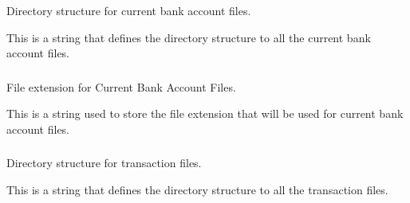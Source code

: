 Directory structure for current bank account files. 

This is a string that defines the directory structure to all the current bank account files. \hypertarget{classInteractiveStreamHandler_a422f78691f53bc8a8b79f2c8e7edc04f}{
\subsubsection[{current\_\-bank\_\-accounts\_\-file\_\-name}]{}}
\label{classInteractiveStreamHandler_a422f78691f53bc8a8b79f2c8e7edc04f}


File extension for Current Bank Account Files. 

This is a string used to store the file extension that will be used for current bank account files. \hypertarget{classInteractiveStreamHandler_afb0932ba0075caf93d401e5d695e963f}{
\subsubsection[{tra\_\-directory}]{}}
\label{classInteractiveStreamHandler_afb0932ba0075caf93d401e5d695e963f}


Directory structure for transaction files. 

This is a string that defines the directory structure to all the transaction files. \hypertarget{classInteractiveStreamHandler_a64aa30a05a73cac597f445d5a581f4b9}{
\subsubsection[{transaction\_\-file\_\-extension}]{}}
\label{classInteractiveStreamHandler_a64aa30a05a73cac597f445d5a581f4b9}



